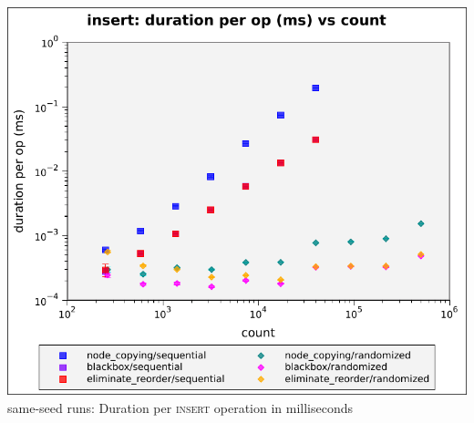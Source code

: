\documentclass{beamer}
\begin{document}
\begin{frame}
\begin{columns}[t]
\begin{column}{0.5\textwidth}
      \includegraphics[height=0.55\textheight]{figures/graphs/insert-duration-per-op-vs-count.pdf}
       same-seed runs: Duration per \textsc{insert} operation in milliseconds\vphantom{ --- only head node}
  \end{column}
\end{columns}
\end{frame}
\end{document}
